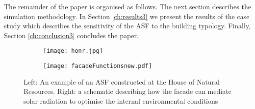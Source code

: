 The remainder of the paper is organised as follows. The next section describes the simulation methodology. In Section \ref{ch:results3} we present the results of the case study which describes the sensitivity of the ASF to the building typology. Finally, Section \ref{ch:conclusion3} concludes the paper.

\begin{figure}
    \centering
    \begin{subfigure}[b]{0.47\textwidth}
        \texttt{[image: honr.jpg]}
		\label{fig:HoNR}
    \end{subfigure} \hfill
    \begin{subfigure}[b]{0.47\textwidth}
        \texttt{[image: facadeFunctionsnew.pdf]}
		\label{fig:ASFschematic3}
    \end{subfigure}
    \caption{Left: An example of an ASF constructed at the House of Natural Resources. Right: a schematic describing how the facade can mediate solar radiation to optimise the internal environmental conditions \cite{nagy2016adaptive}}
    \label{fig:introduction3}
\end{figure}









